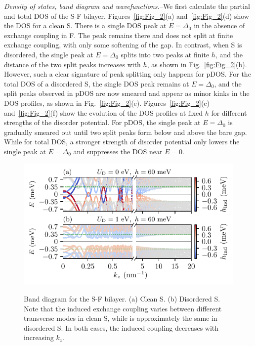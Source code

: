 \documentclass[aps,prl,twocolumn,superscriptaddress,showpacs,longbibliography]{revtex4-1}
\begin{document}
\emph{Density of states, band diagram and wavefunctions.}--We first calculate the partial and total DOS of the S-F bilayer.
Figures~\ref{fig:Fig_2}(a) and~\ref{fig:Fig_2}(d) show the DOS for a clean S.
There is a single DOS peak at $E = \Delta_0$ in the absence of exchange coupling in F.
The peak remains there and does not split at finite exchange coupling, with only some softening of the gap.
In contrast, when S is disordered, the single peak at $E = \Delta_0$ splits into two peaks at finite $h$, and the distance of the two split peaks increases with $h$, as shown in Fig.~\ref{fig:Fig_2}(b). 
However, such a clear signature of peak splitting only happens for pDOS.
For the total DOS of a disordered S, the single DOS peak remains at $E = \Delta_0$, and the split peaks observed in pDOS are now smeared and appear as minor kinks in the DOS profiles, as shown in Fig.~\ref{fig:Fig_2}(e).
Figures~\ref{fig:Fig_2}(c) and~\ref{fig:Fig_2}(f) show the evolution of the DOS profiles at fixed $h$ for different strengths of the disorder potential. For pDOS, the single peak at $E=\Delta_0$ is gradually smeared out until two split peaks form below and above the bare gap.
While for total DOS, a stronger strength of disorder potential only lowers the single peak at $E=\Delta_0$ and suppresses the DOS near $E=0$.



\begin{figure}[t]
\centering
{\includegraphics[width = \linewidth]{Fig_3.pdf}}
\caption{Band diagram for the S-F bilayer. (a) Clean S. (b) Disordered S.
Note that the induced exchange coupling varies between different transverse modes in clean S, while is approximately the same in disordered S. In both cases, the induced coupling decreases with increasing $k_z$. }
\label{fig:Fig_3}
\end{figure}
\end{document}

